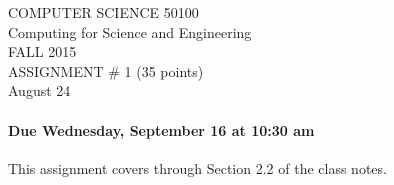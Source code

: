 \documentclass[11pt]{article}
\begin{document}
\begin{center}
{\Large COMPUTER SCIENCE 50100}\\
{\Large Computing for Science and Engineering} \\
{\large FALL 2015} \\

ASSIGNMENT \# 1 (35 points) \\
{\small August 24}


\end{center}

\paragraph{Due Wednesday, September 16 at 10:30 am}

This assignment covers through Section 2.2 of the class notes.
\end{document}
